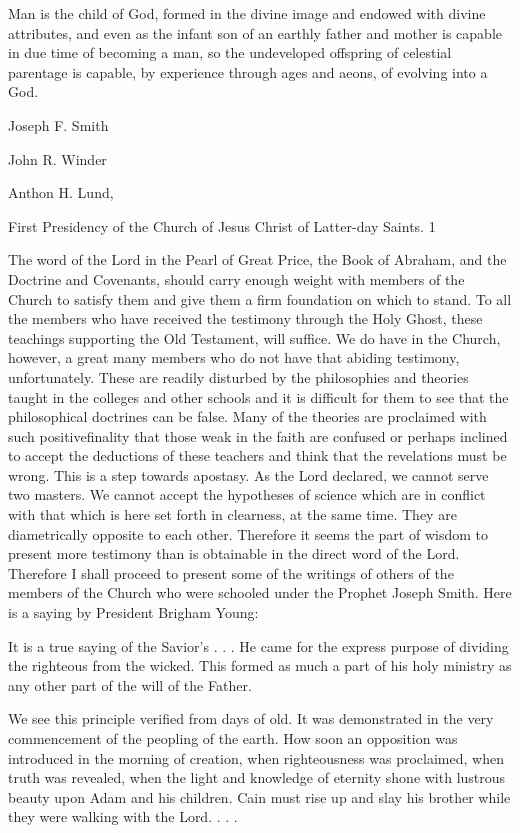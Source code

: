 Man is the child of God, formed in the divine image and endowed with divine attributes, and
even as the infant son of an earthly father and mother is capable in due time of becoming a
man, so the undeveloped offspring of celestial parentage is capable, by experience through
ages and aeons, of evolving into a God.

Joseph F. Smith

John R. Winder

Anthon H. Lund,

First Presidency of the Church of Jesus Christ of Latter-day Saints. 1

The word of the Lord in the Pearl of Great Price, the Book of Abraham, and the Doctrine and
Covenants, should carry enough weight with members of the Church to satisfy them and give
them a firm foundation on which to stand. To all the members who have received the
testimony through the Holy Ghost, these teachings supporting the Old Testament, will
suffice. We do have in the Church, however, a great many members who do not have that
abiding testimony, unfortunately. These are readily disturbed by the philosophies and
theories taught in the colleges and other schools and it is difficult for them to see that the
philosophical doctrines can be false. Many of the theories are proclaimed with such positivefinality that those weak in the faith are confused or perhaps inclined to accept the deductions
of these teachers and think that the revelations must be wrong. This is a step towards
apostasy. As the Lord declared, we cannot serve two masters. We cannot accept the
hypotheses of science which are in conflict with that which is here set forth in clearness, at
the same time. They are diametrically opposite to each other. Therefore it seems the part of
wisdom to present more testimony than is obtainable in the direct word of the Lord.
Therefore I shall proceed to present some of the writings of others of the members of the
Church who were schooled under the Prophet Joseph Smith. Here is a saying by President
Brigham Young:

It is a true saying of the Savior's . . . He came for the express purpose of dividing the
righteous from the wicked. This formed as much a part of his holy ministry as any other part
of the will of the Father.

We see this principle verified from days of old. It was demonstrated in the very
commencement of the peopling of the earth. How soon an opposition was introduced in the
morning of creation, when righteousness was proclaimed, when truth was revealed, when the
light and knowledge of eternity shone with lustrous beauty upon Adam and his children. Cain
must rise up and slay his brother while they were walking with the Lord. . . .

